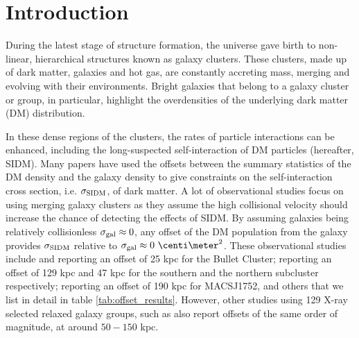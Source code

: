 

\section{Introduction} 
During the latest stage of structure formation, the universe gave birth to
non-linear, hierarchical structures known as galaxy clusters. 
These clusters, made up of dark matter, galaxies and hot gas,
are constantly accreting mass, merging and evolving with their
environments. Bright galaxies that belong to a galaxy cluster or group, in 
particular, highlight the overdensities of the underlying dark matter (DM) 
distribution. 

In these dense regions of the clusters, the rates of particle
interactions can be enhanced, including the long-suspected self-interaction of DM
particles (hereafter, SIDM).  
Many papers have used the offsets between the summary statistics of the DM
density and the galaxy density to give constraints on 
the self-interaction cross
section, i.e. $\sigma_{\rm SIDM}$, of dark matter. 
A lot of observational studies focus on using merging galaxy clusters
as they assume the high collisional velocity should increase the chance
of detecting the effects of SIDM.
By assuming galaxies being relatively collisionless $\sigma_{\rm gal} \approx 0$, 
any offset of the DM population from the galaxy provides $\sigma_{\rm SIDM}$ 
relative to $\sigma_{\rm gal} \approx 0~\centi\meter^2$. 
These observational studies include \cite{Markevitch2004} and \cite{Bradac2006b}  
reporting an offset of 25 kpc for the Bullet Cluster;  
\cite{Dawson2013} reporting an offset of 129 kpc and 47 kpc for the southern
and the northern subcluster respectively;
\cite{Jee2015} reporting an offset of 190 kpc for MACSJ1752, and others that we
list in detail in table \ref{tab:offset_results}.
However, other studies using 129 X-ray selected relaxed galaxy groups, 
such as \cite{George2012a} also report offsets of the same order of magnitude,
at around $50 - 150$ kpc. 

